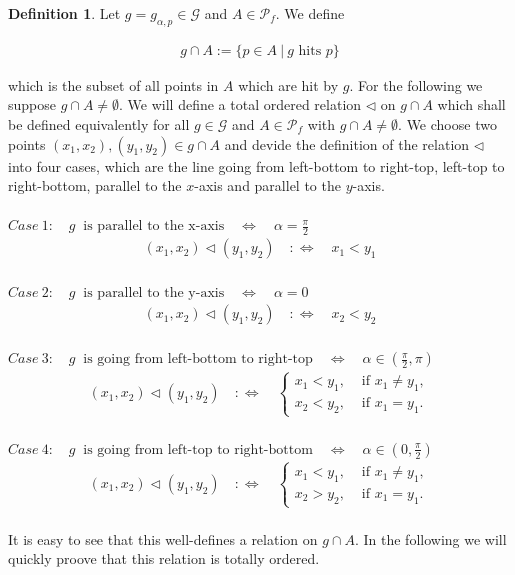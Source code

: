 \documentclass[12pt,a4paper]{scrartcl}
\numberwithin{equation}{subsection}
\newcommand{\1}{\mathbbm{1}}
\newcommand{\G}{\mathcal{G}}
\numberwithin{equation}{section}
\theoremstyle{definition}
\newtheorem{definition}{Definition}[subsection]
\begin{document}
\begin{definition}
	Let $g=g_{\alpha,p}\in \G$ and $A\in \mathcal{P}_f$. We define 
	
	\begin{align*}
		g\cap A := \{ p\in A\ |\ g \text{ hits } p\}
	\end{align*}
	
	which is the subset of all points in $A$ which are hit by $g$. For the following we suppose $g\cap A \neq \emptyset$. We will define a total ordered relation $\triangleleft$ on $g\cap A$ which shall be defined equivalently for all $g\in \G$ and $A\in\mathcal{P}_f$ with $g\cap A \neq\emptyset$. We choose two points $(x_1,x_2),(y_1,y_2)\in g\cap A$ and devide the definition of the relation $\triangleleft$ into four cases, which are the line going from left-bottom to right-top, left-top to right-bottom, parallel to the $x$-axis and parallel to the $y$-axis. \\
	\\
	$\mathit{Case}\ 1:\quad g\ \text{ is parallel to the x-axis}\quad \Leftrightarrow\quad \alpha = \frac{\pi}{2}$
	\begin{align*}
	(x_1, x_2) \triangleleft (y_1, y_2) \quad :\Leftrightarrow \quad x_1 < y_1
	\end{align*}\\
	$\mathit{Case}\ 2:\quad g\ \text{ is parallel to the y-axis}\quad \Leftrightarrow\quad \alpha = 0$
	\begin{align*}
	(x_1, x_2) \triangleleft (y_1, y_2) \quad :\Leftrightarrow \quad x_2 < y_2
	\end{align*}\\
	$\mathit{Case}\ 3:\quad g\ \text{ is going from left-bottom to right-top}\quad \Leftrightarrow\quad \alpha\in (\frac{\pi}{2},\pi)$
	\begin{align*}
	(x_1, x_2) \triangleleft (y_1, y_2) \quad :\Leftrightarrow \quad
		\begin{cases}
			x_1 < y_1, & \text{ if } x_1 \neq y_1, \\
			x_2 < y_2, & \text{ if } x_1 = y_1.
		\end{cases}
	\end{align*}\\
	$\mathit{Case}\ 4:\quad g\ \text{ is going from left-top to right-bottom}\quad \Leftrightarrow\quad \alpha\in (0,\frac{\pi}{2})$
	\begin{align*}
	(x_1, x_2) \triangleleft (y_1, y_2) \quad :\Leftrightarrow \quad
	\begin{cases}
	x_1 < y_1, & \text{ if } x_1 \neq y_1, \\
	x_2 > y_2, & \text{ if } x_1 = y_1.
	\end{cases}
	\end{align*}\\
	It is easy to see that this well-defines a relation on $g\cap A$. In the following we will quickly proove that this relation is totally ordered. 
\end{definition}
\end{document}
